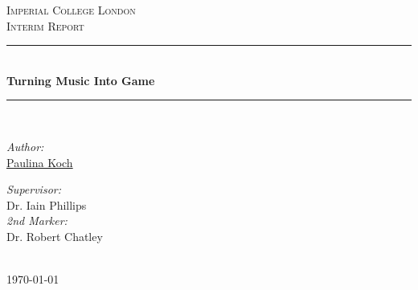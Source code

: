 \documentclass[11pt, oneside]{Thesis} %
\title{\ttitle} %
\begin{document}
\frontmatter %


\fancyhead{} %
\rhead{\thepage} %
\lhead{} %

\pagestyle{fancy} %

\newcommand{\HRule}{\rule{\linewidth}{0.5mm}} %

\hypersetup{pdfsubject=\subjectname}
\hypersetup{pdfauthor=\authornames}
\hypersetup{pdfkeywords=\keywordnames}


\begin{titlepage}
\begin{center}

\textsc{\LARGE Imperial College London}\\[1.5cm] %
\textsc{\Large Interim Report}\\[0.5cm] %

\HRule \\[0.4cm] %
{\huge \bfseries Turning Music Into Game}\\[0.4cm] %
\HRule \\[1.5cm] %
 
\begin{minipage}{0.4\textwidth}
\begin{flushleft} \large
\emph{Author:}\\
\href{pak11@doc.ic.ac.uk}{Paulina Koch} %
\end{flushleft}
\end{minipage}
\begin{minipage}{0.4\textwidth}
\begin{flushright} \large
\emph{Supervisor:} \\
Dr. Iain Phillips \\ \vspace{20pt}
\emph{2nd Marker:} \\
Dr. Robert Chatley
\end{flushright}
\end{minipage}\\[3cm]
 
 
{\large \today}\\[4cm] %
 
\vfill
\end{center}

\end{titlepage}
\end{document}
